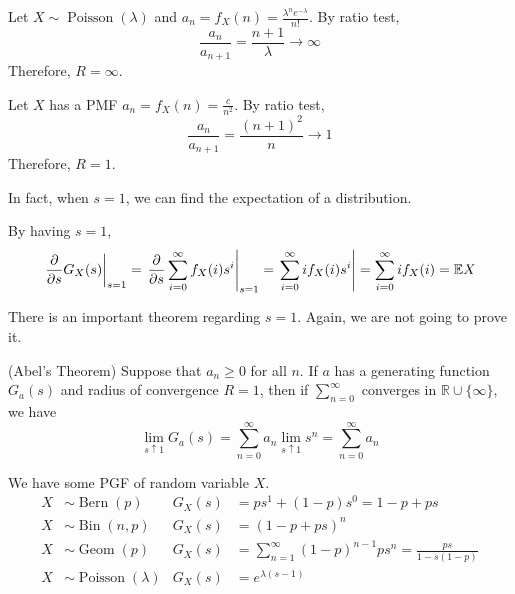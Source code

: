 \documentclass{huhtakm-template-book}
\newcommand{\expect}{\mathbb{E}}
\DeclareMathOperator{\Bern}{Bern}
\DeclareMathOperator{\Bin}{Bin}
\DeclareMathOperator{\Geom}{Geom}
\DeclareMathOperator{\Poisson}{Poisson}
\begin{document}
\newpage
\begin{eg}
    Let $X\sim\Poisson(\lambda)$ and  $a_{n}=f_{X}(n)=\frac{\lambda^{n}e^{-\lambda}}{n!}$. By ratio test,
    \begin{equation*}
        \frac{a_{n}}{a_{n+1}}=\frac{n+1}{\lambda}\to\infty
    \end{equation*}
    Therefore, $R=\infty$.
\end{eg}
\begin{eg}
    Let $X$ has a PMF $a_{n}=f_{X}(n)=\frac{c}{n^{2}}$. By ratio test,
    \begin{equation*}
        \frac{a_{n}}{a_{n+1}}=\frac{(n+1)^{2}}{n}\to 1
    \end{equation*}
    Therefore, $R=1$.
\end{eg}
In fact, when $s=1$, we can find the expectation of a distribution.
\begin{eg}
    \label{Expectation from PGF}
    By having $s=1$,
    \begin{equation*}
        \left.\pdv*{G_{X}(s)}{s}\right|_{s=1}=\left.\pdv*{\sum_{i=0}^{\infty}f_{X}(i)s^{i}}{s}\right|_{s=1}=\left.\sum_{i=0}^{\infty}if_{X}(i)s^{i}\right|=\sum_{i=0}^{\infty}if_{X}(i)=\expect X
    \end{equation*}
\end{eg}
There is an important theorem regarding $s=1$. Again, we are not going to prove it.
\begin{thm}(Abel's Theorem)
    Suppose that $a_{n}\geq 0$ for all $n$. If $a$ has a generating function $G_{a}(s)$ and radius of convergence $R=1$, then if $\sum_{n=0}^{\infty}$ converges in $\mathbb{R}\cup\{\infty\}$, we have
    \begin{equation*}
        \lim_{s\uparrow 1}G_{a}(s)=\sum_{n=0}^{\infty}a_{n}\lim_{s\uparrow 1}s^{n}=\sum_{n=0}^{\infty}a_{n}
    \end{equation*}
\end{thm}
\begin{eg}
    We have some PGF of random variable $X$.
    \begin{align*}
        X&\sim\Bern(p) & G_{X}(s)&=ps^{1}+(1-p)s^{0}=1-p+ps\\
        X&\sim\Bin(n,p) & G_{X}(s)&=(1-p+ps)^{n}\\
        X&\sim\Geom(p) & G_{X}(s)&=\sum_{n=1}^{\infty}(1-p)^{n-1}ps^{n}=\frac{ps}{1-s(1-p)}\\
        X&\sim\Poisson(\lambda) & G_{X}(s)&=e^{\lambda(s-1)}
    \end{align*}
\end{eg}
\end{document}
